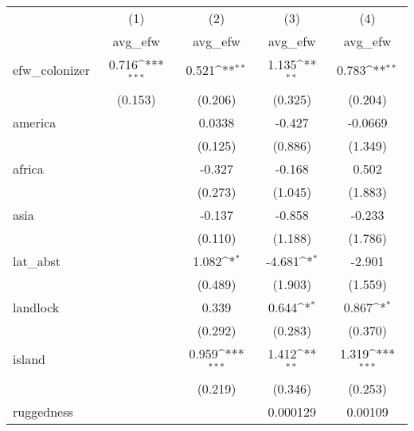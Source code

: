 {
\def\sym#1{\ifmmode^{#1}\else\(^{#1}\)\fi}
\begin{tabular}{l*{4}{c}}
\hline\hline
            &\multicolumn{1}{c}{(1)}&\multicolumn{1}{c}{(2)}&\multicolumn{1}{c}{(3)}&\multicolumn{1}{c}{(4)}\\
            &\multicolumn{1}{c}{avg\_efw}&\multicolumn{1}{c}{avg\_efw}&\multicolumn{1}{c}{avg\_efw}&\multicolumn{1}{c}{avg\_efw}\\
\hline
efw\_colonizer&       0.716\sym{***}&       0.521\sym{**} &       1.135\sym{**} &       0.783\sym{**} \\
            &     (0.153)         &     (0.206)         &     (0.325)         &     (0.204)         \\
[1em]
america     &                     &      0.0338         &      -0.427         &     -0.0669         \\
            &                     &     (0.125)         &     (0.886)         &     (1.349)         \\
[1em]
africa      &                     &      -0.327         &      -0.168         &       0.502         \\
            &                     &     (0.273)         &     (1.045)         &     (1.883)         \\
[1em]
asia        &                     &      -0.137         &      -0.858         &      -0.233         \\
            &                     &     (0.110)         &     (1.188)         &     (1.786)         \\
[1em]
lat\_abst    &                     &       1.082\sym{*}  &      -4.681\sym{*}  &      -2.901         \\
            &                     &     (0.489)         &     (1.903)         &     (1.559)         \\
[1em]
landlock    &                     &       0.339         &       0.644\sym{*}  &       0.867\sym{*}  \\
            &                     &     (0.292)         &     (0.283)         &     (0.370)         \\
[1em]
island      &                     &       0.959\sym{***}&       1.412\sym{**} &       1.319\sym{***}\\
            &                     &     (0.219)         &     (0.346)         &     (0.253)         \\
[1em]
ruggedness  &                     &                     &    0.000129         &     0.00109         \\

\end{tabular}}
